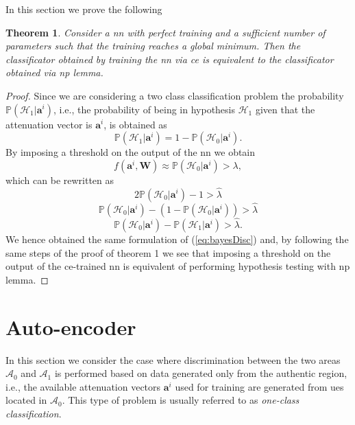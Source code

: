 \documentclass[draftcls,onecolumn,12pt]{IEEEtran}
\newtheorem{theorem}{Theorem}
\begin{document}
In this section we prove the following
\begin{theorem}
\label{th:nn_np2}
Consider a \ac{nn} with perfect training and a sufficient number of parameters such that the training reaches a global minimum. Then the classificator obtained by training the \ac{nn} via \ac{ce} is equivalent to the classificator obtained via \ac{np} lemma.
\end{theorem}
\begin{proof}
Since we are considering a two class classification problem the probability $\mathbb{P}(\mathcal{H}_1|\bm{a}^i)$, i.e., the probability of being in hypothesis $\mathcal{H}_1$ given that the attenuation vector is $\bm{a}^i$, is obtained as
\begin{equation}
    \mathbb{P}(\mathcal{H}_1|\bm{a}^i) = 1- \mathbb{P}(\mathcal{H}_0|\bm{a}^i).
\end{equation}
By imposing a threshold on the output of the \ac{nn} we obtain
\begin{equation}
    f(\bm{a}^i,\bm{W}) \approx \mathbb{P}(\mathcal{H}_0|\bm{a}^i) > \lambda,
\end{equation}
which can be rewritten as
\begin{equation}
    2\mathbb{P}(\mathcal{H}_0|\bm{a}^i)-1 > \hat{\lambda}
\end{equation}
\begin{equation}
    \mathbb{P}(\mathcal{H}_0|\bm{a}^i)-(1-\mathbb{P}(\mathcal{H}_0|\bm{a}^i)) > \hat{\lambda}
\end{equation}
\begin{equation}
    \mathbb{P}(\mathcal{H}_0|\bm{a}^i)-\mathbb{P}(\mathcal{H}_1|\bm{a}^i) > \hat{\lambda}.
\end{equation}
We hence obtained the same formulation of (\ref{eq:bayesDisc}) and, by following the same steps of the proof of theorem 1 we see that imposing a threshold on the output of the \ac{ce}-trained \ac{nn} is equivalent of performing hypothesis testing with \ac{np} lemma.
\end{proof}

\section{Auto-encoder}\label{sec:auto}
In this section we consider the case where discrimination between the two areas $\mathcal{A}_0$ and $\mathcal{A}_1$ is performed based on data generated only from the authentic region, i.e., the available attenuation vectors $\bm{a}^i$ used for training are generated from \acp{ue} located in $\mathcal{A}_0$. This type of problem is usually referred to as \textit{one-class classification}. 
\end{document}
